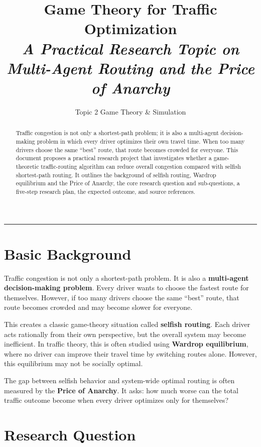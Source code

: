 \documentclass[11pt,a4paper]{article}
\title{\vspace{-0.6in}\bfseries\Large Game Theory for Traffic Optimization\\[2pt]
\large\mdseries\itshape A Practical Research Topic on Multi-Agent Routing and the Price of Anarchy}
\author[1]{Topic 2 \textbullet{} Game Theory \& Simulation}
\affil[1]{Practical Algorithm Research Series \textbullet{} 2026}
\date{}
\begin{document}
\maketitle
\thispagestyle{fancy}

\begin{abstract}
\noindent
Traffic congestion is not only a shortest-path problem; it is also a multi-agent decision-making problem in which every driver optimizes their own travel time. When too many drivers choose the same ``best'' route, that route becomes crowded for everyone. This document proposes a practical research project that investigates whether a game-theoretic traffic-routing algorithm can reduce overall congestion compared with selfish shortest-path routing. It outlines the background of selfish routing, Wardrop equilibrium and the Price of Anarchy, the core research question and sub-questions, a five-step research plan, the expected outcome, and source references.
\end{abstract}

\noindent\rule{\textwidth}{0.4pt}

\section{Basic Background}

Traffic congestion is not only a shortest-path problem. It is also a \textbf{multi-agent decision-making problem}. Every driver wants to choose the fastest route for themselves. However, if too many drivers choose the same ``best'' route, that route becomes crowded and may become slower for everyone.

This creates a classic game-theory situation called \textbf{selfish routing}. Each driver acts rationally from their own perspective, but the overall system may become inefficient. In traffic theory, this is often studied using \textbf{Wardrop equilibrium}, where no driver can improve their travel time by switching routes alone. However, this equilibrium may not be socially optimal.

The gap between selfish behavior and system-wide optimal routing is often measured by the \textbf{Price of Anarchy}. It asks: how much worse can the total traffic outcome become when every driver optimizes only for themselves?

\section{Research Question}
\end{document}
